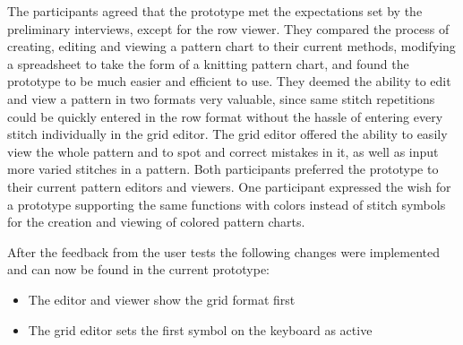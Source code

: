 The participants agreed that the prototype met the expectations set by the preliminary interviews, except for the row viewer. They compared the process of creating, editing and viewing a pattern chart to their current methods, modifying a spreadsheet to take the form of a knitting pattern chart, and found the prototype to be much easier and efficient to use. They deemed the ability to edit and view a pattern in two formats very valuable, since same stitch repetitions could be quickly entered in the row format without the hassle of entering every stitch individually in the grid editor. The grid editor offered the ability to easily view the whole pattern and to spot and correct mistakes in it, as well as input more varied stitches in a pattern. Both participants preferred the prototype to their current pattern editors and viewers. One participant expressed the wish for a prototype supporting the same functions with colors instead of stitch symbols for the creation and viewing of colored pattern charts.

After the feedback from the user tests the following changes were implemented and can now be found in the current prototype:

\begin{itemize}
	\item The editor and viewer show the grid format first
	\item The grid editor sets the first symbol on the keyboard as active
\end{itemize} 